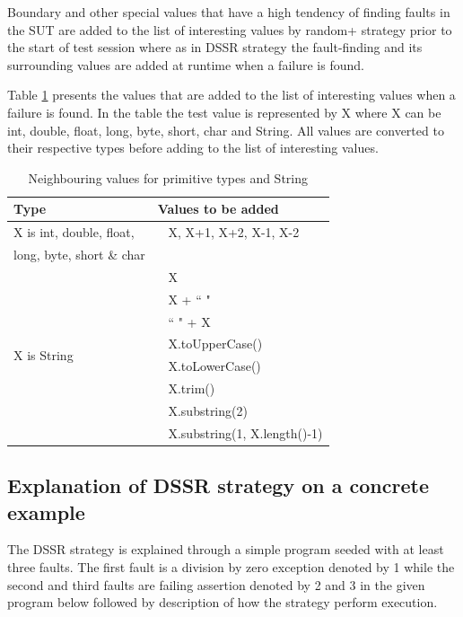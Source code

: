 \documentclass{acm_proc_article-sp}
\begin{document}
Boundary and other special values that have a high tendency of finding faults in the SUT are added to the list of interesting values by random+ strategy prior to the start of test session where as in DSSR strategy the fault-finding and its surrounding values are added at runtime when a failure is found. 

Table \ref{table:addvalues} presents the values that are added to the list of interesting values when a failure is found. In the table the test value is represented by X where X can be int, double, float, long, byte, short, char and String. All values are converted to their respective types before adding to the list of interesting values.

\begin{table}[ht]
\caption{Neighbouring values for primitive types and String} %
\centering %
\begin{tabular}{| l | l |} %
\hline\hline %
Type & Values to be added\\ [0.5ex] %
\hline %
\multirow{1}{*}{X is int, double, float, } & ~ X,  X+1, X+2, X-1, X-2 \\ %
\multirow{1}{*}{long, byte, short \& char} &  \\ 

\hline
\multirow{8}{*}{X is String} & ~ X\\ %

& ~ X + ``  "\\ %
& ~ ``  " + X \\ %
& ~ X.toUpperCase() \\
& ~ X.toLowerCase() \\
& ~ X.trim() \\
& ~ X.substring(2) \\
& ~ X.substring(1, X.length()-1) \\[1ex]
\hline
\hline %
\end{tabular}
\bigskip
\label{table:addvalues} %
\end{table}







\subsection{Explanation of DSSR strategy on a concrete example}
The DSSR strategy is explained through a simple program seeded with at least three faults. The first fault is a division by zero exception denoted by 1 while the second and third faults are failing assertion denoted by 2 and 3 in the given program below followed by description of how the strategy perform execution.
\end{document}
